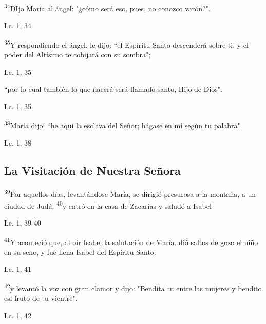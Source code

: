 \documentclass[a4paper,11pt]{article}
\begin{document}
      \textsuperscript{34}DIjo María al ángel: "¿cómo será eso, pues, no conozco varón?".
      \begin{flushright}
        Lc. 1, 34
      \end{flushright}
      \medskip
      
      \textsuperscript{35}Y respondiendo el ángel, le dijo: ``el Espíritu Santo descenderá sobre ti, y el poder del Altísimo te cobijará con su sombra";
      \begin{flushright}
        Lc. 1, 35
      \end{flushright}
      \medskip

      ``por lo cual también lo que nacerá será llamado santo, Hijo de Dios".
      \begin{flushright}
        Lc. 1, 35
      \end{flushright}
      \medskip

      \textsuperscript{38}María dijo: ``he aquí la esclava del Señor; hágase en mí según tu palabra".
      \begin{flushright}
        Lc. 1, 38
      \end{flushright}
      \medskip
            
    \subsection*{\hfil La Visitación de Nuestra Señora \hfil}
      
      \textsuperscript{39}Por aquellos días, levantándose María, se dirigió presurosa a la montaña, a un ciudad de Judá, \textsuperscript{40}y entró en la casa
      de Zacarías y saludó a Isabel
      \begin{flushright}
        Lc. 1, 39-40        
      \end{flushright}
      \medskip
      
      \textsuperscript{41}Y aconteció que, al oír Isabel la salutación de María. dió saltos de gozo el niño en su seno, y fué llena Isabel del Espíritu Santo.
      \begin{flushright}
        Lc. 1, 41        
      \end{flushright}
      \medskip
      
      \textsuperscript{42}y levantó la voz con gran clamor y dijo: "Bendita tu entre las mujeres y bendito esl fruto de tu vientre".
      \begin{flushright}
        Lc. 1, 42         
      \end{flushright}
      \medskip
      
\end{document}
